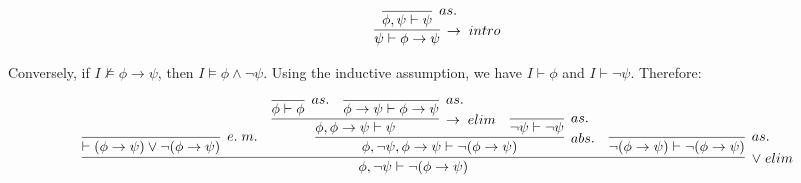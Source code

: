 \begin{align*}
\infer[\rightarrow\; intro]{\psi \vdash \phi \rightarrow \psi}{
  \infer[as.]{\phi, \psi \vdash \psi}{}
}
\end{align*}

Conversely, if $I \not\models \phi \rightarrow \psi$, then $I \models \phi \land \neg \psi$. Using the inductive assumption, we have $I \vdash \phi$ and $I \vdash \neg\psi$. Therefore:

\begin{align*}
\infer[\lor\; elim]{\phi, \neg \psi \vdash \neg(\phi \rightarrow \psi)}{
  \infer[e.\; m.]{\vdash (\phi \rightarrow \psi) \lor \neg(\phi \rightarrow \psi)}{}
  &
  \infer[abs.]{\phi, \neg \psi, \phi \rightarrow \psi \vdash \neg(\phi \rightarrow \psi)}{
    \infer[\rightarrow\; elim]{\phi, \phi \rightarrow \psi \vdash \psi}{
      \infer[as.]{\phi \vdash \phi}{}
      &
      \infer[as.]{\phi \rightarrow \psi \vdash \phi \rightarrow \psi}{}
    }
    &
    \infer[as.]{\neg \psi \vdash \neg \psi}{}
  }
  &
  \infer[as.]{\neg(\phi \rightarrow \psi) \vdash \neg(\phi \rightarrow \psi)}{}
}
\end{align*}


